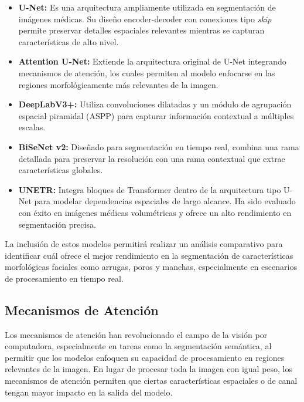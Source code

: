 \begin{itemize}
    \item \textbf{U-Net:} Es una arquitectura ampliamente utilizada en segmentación de imágenes médicas. Su diseño encoder-decoder con conexiones tipo \textit{skip} permite preservar detalles espaciales relevantes mientras se capturan características de alto nivel. \parencite{ronneberger2015unet}

    \item \textbf{Attention U-Net:} Extiende la arquitectura original de U-Net integrando mecanismos de atención, los cuales permiten al modelo enfocarse en las regiones morfológicamente más relevantes de la imagen. \parencite{oktay2018attentionunet}

    \item \textbf{DeepLabV3+:} Utiliza convoluciones dilatadas y un módulo de agrupación espacial piramidal (ASPP) para capturar información contextual a múltiples escalas. \parencite{chen2018deeplabv3plus}

    \item \textbf{BiSeNet v2:} Diseñado para segmentación en tiempo real, combina una rama detallada para preservar la resolución con una rama contextual que extrae características globales. \parencite{yu2021bisenetv2}

    \item \textbf{UNETR:} Integra bloques de Transformer dentro de la arquitectura tipo U-Net para modelar dependencias espaciales de largo alcance. Ha sido evaluado con éxito en imágenes médicas volumétricas y ofrece un alto rendimiento en segmentación precisa. \parencite{hatamizadeh2022unetr}
\end{itemize}

La inclusión de estos modelos permitirá realizar un análisis comparativo para identificar cuál ofrece el mejor rendimiento en la segmentación de características morfológicas faciales como arrugas, poros y manchas, especialmente en escenarios de procesamiento en tiempo real.
\subsection{Mecanismos de Atención}
Los mecanismos de atención han revolucionado el campo de la visión por computadora, especialmente en tareas como la segmentación semántica, al permitir que los modelos enfoquen su capacidad de procesamiento en regiones relevantes de la imagen. En lugar de procesar toda la imagen con igual peso, los mecanismos de atención permiten que ciertas características espaciales o de canal tengan mayor impacto en la salida del modelo. \parencite{woo2018cbam}

